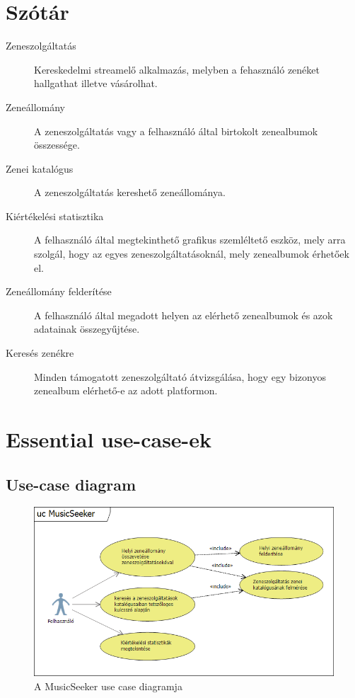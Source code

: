
\section{Szótár}
\label{sec:szotar}


\begin{description}
    \item[Zeneszolgáltatás] Kereskedelmi streamelő alkalmazás, melyben a fehasználó zenéket hallgathat illetve vásárolhat.
    \item[Zeneállomány] A zeneszolgáltatás vagy a felhasználó által birtokolt zenealbumok összessége.
    \item[Zenei katalógus] A zeneszolgáltatás kereshető zeneállománya.
    \item[Kiértékelési statisztika] A felhasználó által megtekinthető grafikus szemléltető eszköz, mely arra szolgál, hogy az egyes zeneszolgáltatásoknál, mely zenealbumok érhetőek el.
    \item[Zeneállomány felderítése] A felhasználó által megadott helyen az elérhető zenealbumok és azok adatainak összegyűjtése.
    \item[Keresés zenékre] Minden támogatott zeneszolgáltató átvizsgálása, hogy egy bizonyos zenealbum elérhető-e az adott platformon.
\end{description}

\section{Essential use-case-ek}
\label{sec:usecaseek}

\subsection{Use-case diagram}
\label{sub:ucdiagram}

\begin{figure}[htp]
\centering
\includegraphics[scale=0.8]{img/01_UseCases.png}
\caption{A MusicSeeker use case diagramja}
\label{fig:01_UseCases}
\end{figure}



